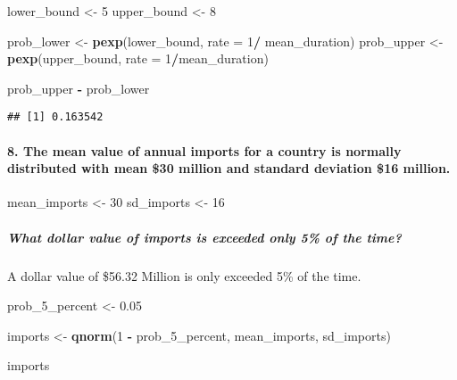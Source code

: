 \documentclass[
]{article}
\newenvironment{Shaded}{\begin{snugshade}}{\end{snugshade}}
\newcommand{\AttributeTok}[1]{\textcolor[rgb]{0.13,0.29,0.53}{#1}}
\newcommand{\DecValTok}[1]{\textcolor[rgb]{0.00,0.00,0.81}{#1}}
\newcommand{\FloatTok}[1]{\textcolor[rgb]{0.00,0.00,0.81}{#1}}
\newcommand{\FunctionTok}[1]{\textcolor[rgb]{0.13,0.29,0.53}{\textbf{#1}}}
\newcommand{\NormalTok}[1]{#1}
\newcommand{\OtherTok}[1]{\textcolor[rgb]{0.56,0.35,0.01}{#1}}
\newcommand{\SpecialCharTok}[1]{\textcolor[rgb]{0.81,0.36,0.00}{\textbf{#1}}}
\begin{document}
\begin{Shaded}
\begin{Highlighting}[]
\NormalTok{lower\_bound }\OtherTok{\textless{}{-}} \DecValTok{5}
\NormalTok{upper\_bound }\OtherTok{\textless{}{-}} \DecValTok{8}

\NormalTok{prob\_lower }\OtherTok{\textless{}{-}} \FunctionTok{pexp}\NormalTok{(lower\_bound, }\AttributeTok{rate =} \DecValTok{1}\SpecialCharTok{/}\NormalTok{ mean\_duration)}
\NormalTok{prob\_upper }\OtherTok{\textless{}{-}} \FunctionTok{pexp}\NormalTok{(upper\_bound, }\AttributeTok{rate =} \DecValTok{1}\SpecialCharTok{/}\NormalTok{mean\_duration)}

\NormalTok{prob\_upper }\SpecialCharTok{{-}}\NormalTok{ prob\_lower}
\end{Highlighting}
\end{Shaded}

\begin{verbatim}
## [1] 0.163542
\end{verbatim}

\hypertarget{the-mean-value-of-annual-imports-for-a-country-is-normally-distributed-with-mean-30-million-and-standard-deviation-16-million.}{%
\paragraph{8. The mean value of annual imports for a country is normally
distributed with mean \$30 million and standard deviation \$16
million.}\label{the-mean-value-of-annual-imports-for-a-country-is-normally-distributed-with-mean-30-million-and-standard-deviation-16-million.}}

\begin{Shaded}
\begin{Highlighting}[]
\NormalTok{mean\_imports }\OtherTok{\textless{}{-}} \DecValTok{30}
\NormalTok{sd\_imports }\OtherTok{\textless{}{-}} \DecValTok{16}
\end{Highlighting}
\end{Shaded}

\hypertarget{what-dollar-value-of-imports-is-exceeded-only-5-of-the-time}{%
\subparagraph{What dollar value of imports is exceeded only 5\% of the
time?}\label{what-dollar-value-of-imports-is-exceeded-only-5-of-the-time}}

A dollar value of \$56.32 Million is only exceeded 5\% of the time.

\begin{Shaded}
\begin{Highlighting}[]
\NormalTok{prob\_5\_percent }\OtherTok{\textless{}{-}} \FloatTok{0.05}

\NormalTok{imports }\OtherTok{\textless{}{-}} \FunctionTok{qnorm}\NormalTok{(}\DecValTok{1} \SpecialCharTok{{-}}\NormalTok{ prob\_5\_percent, mean\_imports, sd\_imports)}

\NormalTok{imports}
\end{Highlighting}
\end{Shaded}
\end{document}

